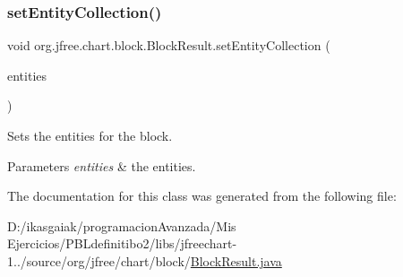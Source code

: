 \subsubsection{\texorpdfstring{set\+Entity\+Collection()}{setEntityCollection()}}
{\footnotesize\ttfamily void org.\+jfree.\+chart.\+block.\+Block\+Result.\+set\+Entity\+Collection (\begin{DoxyParamCaption}\item[{\mbox{\hyperlink{interfaceorg_1_1jfree_1_1chart_1_1entity_1_1_entity_collection}{Entity\+Collection}}}]{entities }\end{DoxyParamCaption})}

Sets the entities for the block.


\begin{DoxyParams}{Parameters}
{\em entities} & the entities. \\
\hline
\end{DoxyParams}


The documentation for this class was generated from the following file\+:\begin{DoxyCompactItemize}
\item 
D\+:/ikasgaiak/programacion\+Avanzada/\+Mis Ejercicios/\+P\+B\+Ldefinitibo2/libs/jfreechart-\/1../source/org/jfree/chart/block/\mbox{\hyperlink{_block_result_8java}{Block\+Result.\+java}}\end{DoxyCompactItemize}
